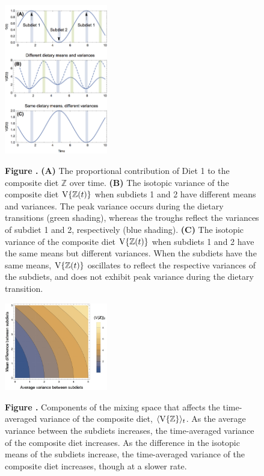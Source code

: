 \documentclass{article}
\begin{document}
\begin{figure}[h!]
\begin{center}
\includegraphics[width=0.4\textwidth]{fig_varZt.jpg}
\end{center}
\textbf{\label{figvarZt} Figure .}{
{\bf(A)} The proportional contribution of Diet 1 to the composite diet $\mathbb{Z}$ over time.
{\bf(B)} The isotopic variance of the composite diet ${\rm V}\{\mathbb{Z}(t)\}$ when subdiets 1 and 2 have different means and variances. The peak variance occurs during the dietary transitions (green shading), whereas the troughs reflect the variances of subdiet 1 and 2, respectively (blue shading).
{\bf(C)} The isotopic variance of the composite diet ${\rm V}\{\mathbb{Z}(t)\}$ when subdiets 1 and 2 have the same means but different variances. When the subdiets have the same means, ${\rm V}\{\mathbb{Z}(t)\}$ oscillates to reflect the respective variances of the subdiets, and does not exhibit peak variance during the dietary transition.
}
\end{figure}

\begin{figure}[h!]
\begin{center}
\includegraphics[width=0.4\textwidth]{fig_varzContour.jpg}
\end{center}
\textbf{\label{figvarcont} Figure .}{
Components of the mixing space that affects the time-averaged variance of the composite diet, $\langle {\rm V}\{\mathbb{Z}\} \rangle_t$.
As the average variance between the subdiets increases, the time-averaged variance of the composite diet increases.
As the difference in the isotopic means of the subdiets increase, the time-averaged variance of the composite diet increases, though at a slower rate.
}
\end{figure}
\end{document}
